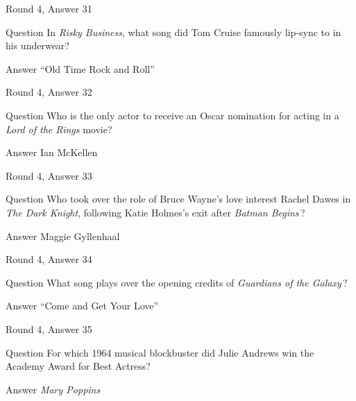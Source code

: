 \documentclass[11pt]{beamer}
\begin{document}
\begin{frame}[t]{Round 4, Answer 31}
\vspace{2em}
\begin{block}{Question}
In \emph{Risky Business}, what song did Tom Cruise famously lip-sync to in his underwear?
\end{block}
\pause{}
\begin{block}{Answer}
``Old Time Rock and Roll''
\end{block}
\end{frame}
    

\begin{frame}[t]{Round 4, Answer 32}
\vspace{2em}
\begin{block}{Question}
Who is the only actor to receive an Oscar nomination for acting in a \emph{Lord of the Rings} movie?
\end{block}
\pause{}
\begin{block}{Answer}
Ian McKellen
\end{block}
\end{frame}
    

\begin{frame}[t]{Round 4, Answer 33}
\vspace{2em}
\begin{block}{Question}
Who took over the role of Bruce Wayne's love interest Rachel Dawes in \emph{The Dark Knight}, following Katie Holmes's exit after \emph{Batman Begins}\,?
\end{block}
\pause{}
\begin{block}{Answer}
Maggie Gyllenhaal
\end{block}
\end{frame}
    

\begin{frame}[t]{Round 4, Answer 34}
\vspace{2em}
\begin{block}{Question}
What song plays over the opening credits of \emph{Guardians of the Galaxy}\,?
\end{block}
\pause{}
\begin{block}{Answer}
``Come and Get Your Love''
\end{block}
\end{frame}
    

\begin{frame}[t]{Round 4, Answer 35}
\vspace{2em}
\begin{block}{Question}
For which 1964 musical blockbuster did Julie Andrews win the Academy Award for Best Actress?
\end{block}
\pause{}
\begin{block}{Answer}
\emph{Mary Poppins}
\end{block}
\end{frame}
    
\end{document}
